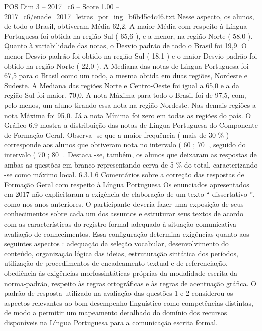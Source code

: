\begin{textsample}{POS Dim 3 – 2017\_c6 – Score 1.00 – 2017\_c6/enade\_2017\_letras\_por\_ing\_b6b45c4c46.txt}
Nesse aspecto, os alunos, de todo o Brasil, obtiveram Média 62,2.
A maior Média com respeito à Língua Portuguesa foi obtida na região Sul ( 65,6 ), e a menor, na região Norte ( 58,0 ).
Quanto à variabilidade das notas, o Desvio padrão de todo o Brasil foi 19,9.
O menor Desvio padrão foi obtido na região Sul ( 18,1 ) e o maior Desvio padrão foi obtido na região Norte ( 22,0 ).
A Mediana das notas de Língua Portuguesa foi 67,5 para o Brasil como um todo, a mesma obtida em duas regiões, Nordeste e Sudeste.
A Mediana das regiões Norte e Centro-Oeste foi igual a 65,0 e a da região Sul foi maior, 70,0.
A nota Máxima para todo o Brasil foi de 97,5, com, pelo menos, um aluno tirando essa nota na região Nordeste.
Nas demais regiões a nota Máxima foi 95,0.
Já a nota Mínima foi zero em todas as regiões do país.
O Gráfico 6.9 mostra a distribuição das notas de Língua Portuguesa do Componente de Formação Geral.
Observa -se que a maior frequência ( mais de 30 \% ) corresponde aos alunos que obtiveram nota no intervalo ( 60 ; 70 ], seguido do intervalo ( 70 ; 80 ].
Destaca -se, também, os alunos que deixaram as respostas de ambas as questões em branco representando cerva de 5 \% do total, caracterizando -se como máximo local. 6.3.1.6 Comentários sobre a correção das respostas de Formação Geral com respeito à Língua Portuguesa Os enunciados apresentados em 2017 não explicitaram a exigência de elaboração de um texto “ dissertativo ”, como nos anos anteriores.
O participante deveria fazer uma exposição de seus conhecimentos sobre cada um dos assuntos e estruturar seus textos de acordo com as características do registro formal adequado à situação comunicativa – avaliação de conhecimentos.
Essa configuração determina exigências quanto aos seguintes aspectos : adequação da seleção vocabular, desenvolvimento do conteúdo, organização lógica das ideias, estruturação sintática dos períodos, utilização de procedimentos de encadeamento textual e de referenciação, obediência às exigências morfossintáticas próprias da modalidade escrita da norma-padrão, respeito às regras ortográficas e às regras de acentuação gráfica.
O padrão de resposta utilizado na avaliação das questões 1 e 2 considerou os aspectos relevantes ao bom desempenho linguístico como competências distintas, de modo a permitir um mapeamento detalhado do domínio dos recursos disponíveis na Língua Portuguesa para a comunicação escrita formal.

\end{textsample}
